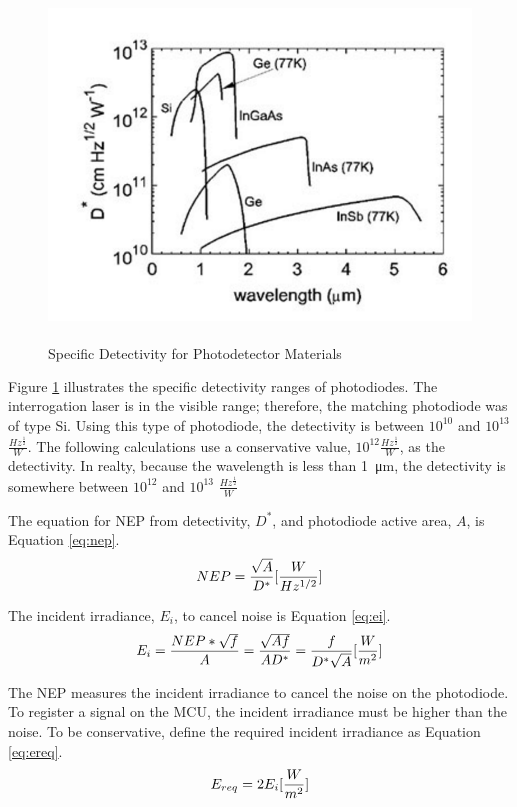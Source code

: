 \documentclass[letterpaper,10pt]{article}
\begin{document}
\begin{spacing}{1.15}
\begin{figure} [H]
	\centering
	\includegraphics[scale=0.4]{detectivity-table.png}
	\label{fig:detectivity-table}
	\caption{Specific Detectivity for Photodetector Materials \textsuperscript{\cite{Optical}} \label{fig:detectivity-table}}
\end{figure}

Figure \ref{fig:detectivity-table} illustrates the specific detectivity ranges of photodiodes. The interrogation laser is in the visible range; therefore, the matching photodiode was of type Si. Using this type of photodiode, the detectivity is between $10^{10}$ and $10^{13}$ $\frac{Hz^{\frac{1}{2}}}{W}$. The following calculations use a conservative value, $10^{12} \frac{Hz^{\frac{1}{2}}}{W}$, as the detectivity. In realty, because the wavelength is less than \SI{1}{\micro\meter}, the detectivity is somewhere between $10^{12}$ and $10^{13}$ $\frac{Hz^{\frac{1}{2}}}{W}$

The equation for NEP from detectivity, $D^*$, and photodiode active area, $A$,  is Equation \ref{eq:nep}.
\begin{equation} \large  \label{eq:nep}
	NEP = \frac{\sqrt{A}}{D^*}  [\frac{W}{Hz^{1/2}}]
\end{equation}

The incident irradiance, $E_i$, to cancel noise is Equation \ref{eq:ei}.
\begin{equation} \large  \label{eq:ei}
	E_i = \frac{NEP * \sqrt{f}}{A} = \frac{\sqrt{Af}}{AD^*} = \frac{f}{D^*\sqrt{A}} [\frac{W}{m^{2}}]
\end{equation}

The NEP measures the incident irradiance to cancel the noise on the photodiode. To register a signal on the MCU, the incident irradiance must be higher than the noise. To be conservative, define the required incident irradiance as Equation \ref{eq:ereq}.
\begin{equation} \large \label{eq:ereq}
	E_{req} = 2E_i [\frac{W}{m^{2}}]
\end{equation}


\end{spacing}
\end{document}
